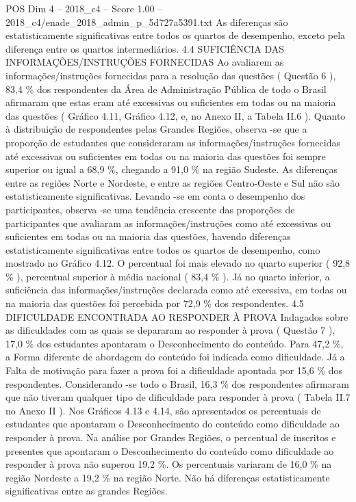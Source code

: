 \begin{textsample}{POS Dim 4 – 2018\_c4 – Score 1.00 – 2018\_c4/enade\_2018\_admin\_p\_5d727a5391.txt}
As diferenças são estatisticamente significativas entre todos os quartos de desempenho, exceto pela diferença entre os quartos intermediários. 4.4 SUFICIÊNCIA DAS INFORMAÇÕES/INSTRUÇÕES FORNECIDAS Ao avaliarem as informações/instruções fornecidas para a resolução das questões ( Questão 6 ), 83,4 \% dos respondentes da Área de Administração Pública de todo o Brasil afirmaram que estas eram até excessivas ou suficientes em todas ou na maioria das questões ( Gráfico 4.11, Gráfico 4.12, e, no Anexo II, a Tabela II.6 ).
Quanto à distribuição de respondentes pelas Grandes Regiões, observa -se que a proporção de estudantes que consideraram as informações/instruções fornecidas até excessivas ou suficientes em todas ou na maioria das questões foi sempre superior ou igual a 68,9 \%, chegando a 91,0 \% na região Sudeste.
As diferenças entre as regiões Norte e Nordeste, e entre as regiões Centro-Oeste e Sul não são estatisticamente significativas.
Levando -se em conta o desempenho dos participantes, observa -se uma tendência crescente das proporções de participantes que avaliaram as informações/instruções como até excessivas ou suficientes em todas ou na maioria das questões, havendo diferenças estatisticamente significativas entre todos os quartos de desempenho, como mostrado no Gráfico 4.12.
O percentual foi mais elevado no quarto superior ( 92,8 \% ), percentual superior à média nacional ( 83,4 \% ).
Já no quarto inferior, a suficiência das informações/instruções declarada como até excessiva, em todas ou na maioria das questões foi percebida por 72,9 \% dos respondentes. 4.5 DIFICULDADE ENCONTRADA AO RESPONDER À PROVA Indagados sobre as dificuldades com as quais se depararam ao responder à prova ( Questão 7 ), 17,0 \% dos estudantes apontaram o Desconhecimento do conteúdo.
Para 47,2 \%, a Forma diferente de abordagem do conteúdo foi indicada como dificuldade.
Já a Falta de motivação para fazer a prova foi a dificuldade apontada por 15,6 \% dos respondentes.
Considerando -se todo o Brasil, 16,3 \% dos respondentes afirmaram que não tiveram qualquer tipo de dificuldade para responder à prova ( Tabela II.7 no Anexo II ).
Nos Gráficos 4.13 e 4.14, são apresentados os percentuais de estudantes que apontaram o Desconhecimento do conteúdo como dificuldade ao responder à prova.
Na análise por Grandes Regiões, o percentual de inscritos e presentes que apontaram o Desconhecimento do conteúdo como dificuldade ao responder à prova não superou 19,2 \%.
Os percentuais variaram de 16,0 \% na região Nordeste a 19,2 \% na região Norte.
Não há diferenças estatisticamente significativas entre as grandes Regiões.

\end{textsample}

